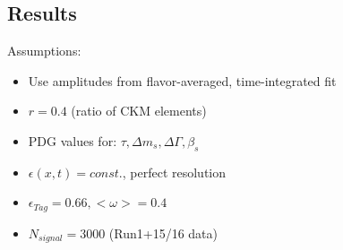 \clearpage
\subsection{Results}

Assumptions:
	\begin{itemize}	
		\item Use amplitudes from flavor-averaged, time-integrated fit
		\item $r = 0.4$ (ratio of CKM elements) 
		\item PDG values for: $\tau,\Delta m_s, \Delta \Gamma, \beta_s$
		\item $\epsilon(x,t) = const.$, perfect resolution  
		\item $\epsilon_{Tag} = 0.66, <\omega> = 0.4 $   
		\item $N_{signal} = 3000$ (Run1+15/16 data)		 
	\end{itemize}
	
